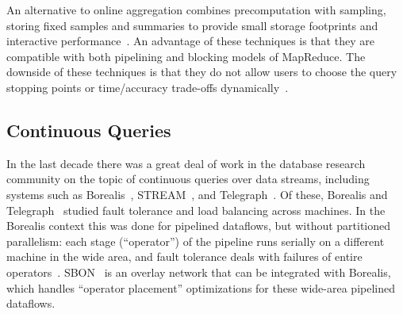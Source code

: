 An alternative to online aggregation combines precomputation with sampling,
storing fixed samples and summaries to provide small storage footprints and
interactive performance~\cite{gibbons98new}. An advantage of these techniques is
that they are compatible with both pipelining and blocking models of
MapReduce. The downside of these techniques is that they do not allow users to
choose the query stopping points or time/accuracy trade-offs
dynamically~\cite{ieeecontrol}.


\subsection{Continuous Queries}
In the last decade there was a great deal of work in the database research
community on the topic of continuous queries over data streams, including
systems such as Borealis~\cite{borealis}, STREAM~\cite{stream}, and
Telegraph~\cite{tcq-cidr}.  Of these, Borealis and Telegraph~\cite{flux-ft}
studied fault tolerance and load balancing across machines.  In the Borealis
context this was done for pipelined dataflows, but without partitioned
parallelism: each stage (``operator'') of the pipeline runs serially on a
different machine in the wide area, and fault tolerance deals with failures of
entire operators~\cite{borealisFT}.  SBON~\cite{sbon} is an overlay network that
can be integrated with Borealis, which handles ``operator placement''
optimizations for these wide-area pipelined dataflows.

